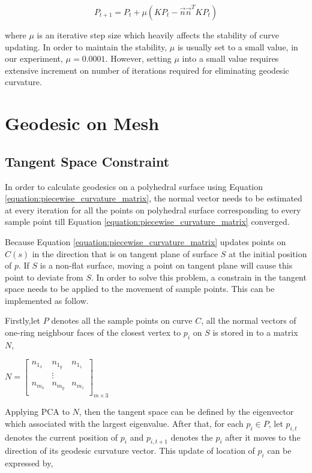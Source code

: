 \begin{equation}
P_{t+1} = P_{t}+\mu(KP_{t}-\vec{n}\vec{n}^{T}KP_{t})
\label{equation:piecewise_curvature_matrix}
\end{equation}

where $\mu$ is an iterative step size which heavily affects the stability of curve updating. In order to maintain the stability, $\mu$ is usually set to a small value, in our experiment, $\mu = 0.0001$. However, setting $\mu$ into a small value requires extensive increment on number of iterations required for eliminating geodesic curvature. 
\section{Geodesic on Mesh}

\subsection{Tangent Space Constraint}

In order to calculate geodesics on a polyhedral surface using Equation \ref{equation:piecewise_curvature_matrix}, the normal vector needs to be estimated at every iteration for all the points on polyhedral surface corresponding to every sample point till Equation \ref{equation:piecewise_curvature_matrix} converged.

Because Equation \ref{equation:piecewise_curvature_matrix} updates points on $C(s)$ in the direction that is on tangent plane of surface $S$ at the initial position of $p$. If $S$ is a non-flat surface, moving a point on tangent plane will cause this point to deviate from $S$. In order to solve this problem, a constrain in the tangent space needs to be applied to the movement of sample points. This can be implemented as follow. 

Firstly,let $P$ denotes all the sample points on curve $C$, all the normal vectors of one-ring neighbour faces of the closest vertex to $p_{i}$ on $S$ is stored in to a matrix $N$,

$N=
\begin{bmatrix}
 	n_{1_{x}} &	n_{1_{y}} & n_{1_{z}}\\
 	& \vdots &\\	
 	n_{m_{x}} &	n_{m_{y}} & n_{m_{z}}\\
\end{bmatrix}_{m\times 3}
$

Applying PCA  to $N$, then the tangent space can be defined by the eigenvector which associated with the largest eigenvalue. After that, for each $p_{i} \in P$, let $p_{i,t}$ denotes the current position of $p_{i}$ and $p_{i,t+1}$ denotes the $p_{i}$ after it moves to the direction of its geodesic curvature vector. This update of location of $p_{i}$ can be expressed by,

